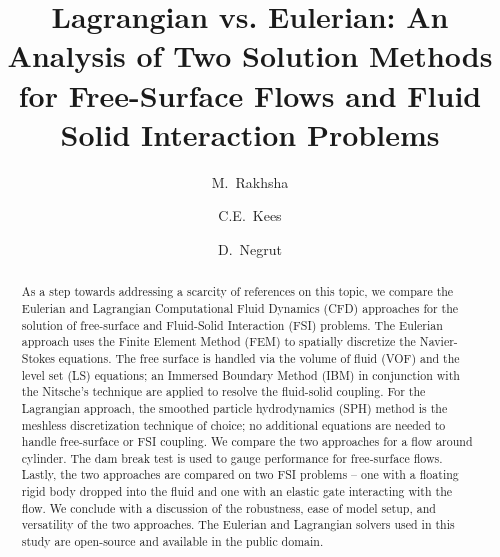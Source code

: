 \documentclass[final,3p,times]{elsarticle}
\begin{document}
\begin{frontmatter}



\title{Lagrangian vs. Eulerian: An Analysis of Two Solution Methods for Free-Surface Flows and Fluid Solid Interaction Problems}


\address[UWMadison]{Department of Mechanical Engineering, University of Wisconsin-Madison, Madison, WI 53706, USA}
\address[LSU]{Department of Civil \& Environmental Engineering, 3240P Patrick F. Taylor Hall, Louisiana State University, Baton Rouge, LA 70803}
\author[UWMadison]{M.~Rakhsha}
\author[LSU]{C.E.~Kees}
\author[UWMadison,cor1]{D.~Negrut}

\begin{abstract}
As a step towards addressing a scarcity of references on this topic, we compare the Eulerian and Lagrangian Computational Fluid Dynamics (CFD) approaches for the solution of free-surface and Fluid-Solid Interaction (FSI) problems. The Eulerian approach uses the Finite Element Method (FEM) to spatially discretize the Navier-Stokes equations. The free surface is handled via the volume of fluid (VOF) and the level set (LS) equations; an Immersed Boundary Method (IBM) in conjunction with the Nitsche's technique are applied to resolve the fluid-solid coupling. For the Lagrangian approach, the smoothed particle hydrodynamics (SPH) method is the meshless discretization technique of choice; no additional equations are needed to handle free-surface or FSI coupling. We compare the two approaches for a flow around cylinder. The dam break test is used to gauge performance for free-surface flows. Lastly, the two approaches are compared on two FSI problems -- one with a floating rigid body dropped into the fluid and one with an elastic gate interacting with the flow. We conclude with a discussion of the robustness, ease of model setup, and versatility of the two approaches. The Eulerian and Lagrangian solvers used in this study are open-source and available in the public domain.
\end{abstract}


\end{frontmatter}
\end{document}
